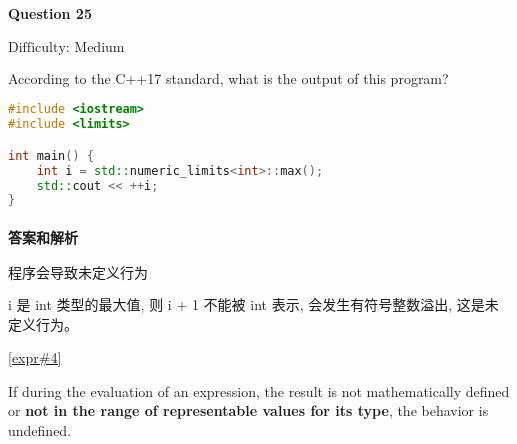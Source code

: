 \documentclass{article}
\begin{document}
	\paragraph*{Question 25}\noindent $\boxed{\text{Difficulty: Medium}} $
	
	According to the C++17 standard, what is the output of this program? 
	
	\begin{lstlisting}[language=C++]    
#include <iostream>
#include <limits>

int main() {
	int i = std::numeric_limits<int>::max();
	std::cout << ++i;
}
	\end{lstlisting}
	
	\paragraph*{答案和解析} $\boxed{\text{程序会导致未定义行为}} $
	
	i 是 int 类型的最大值, 则 i + 1 不能被 int 表示, 会发生有符号整数溢出, 这是未定义行为。
	
	\href{https://timsong-cpp.github.io/cppwp/n4659/expr#4}{[expr\#4]} 
	
	\begin{lightgrayleftbar}
		If during the evaluation of an expression, the result is not mathematically defined or \textbf{not in the range of representable values for its type}, the behavior is undefined.  
	\end{lightgrayleftbar}
	
\end{document}
